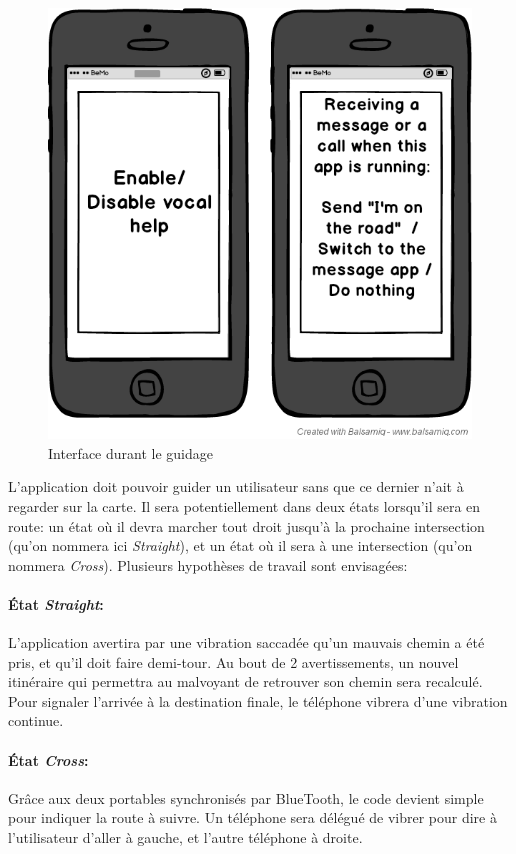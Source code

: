 \documentclass[12pt]{report}
\begin{document}
\begin{figure}[ht]
\begin{center}
\includegraphics[scale=0.3]{Mobile_example.png}
\caption{Interface durant le guidage}
\end{center}
\end{figure}

L'application doit pouvoir guider un utilisateur sans que ce dernier n'ait à regarder sur la carte. Il sera potentiellement dans deux états lorsqu'il sera en route: un état où il devra marcher tout droit jusqu'à la prochaine intersection (qu'on nommera ici \textit{Straight}), et un état où il sera à une intersection (qu'on nommera \textit{Cross}). Plusieurs hypothèses de travail sont envisagées:
\paragraph{État \textit{Straight}: } L'application avertira par une vibration saccadée qu'un mauvais chemin a été pris, et qu'il doit faire demi-tour. Au bout de 2 avertissements, un nouvel itinéraire qui permettra au malvoyant de retrouver son chemin sera recalculé. Pour signaler l'arrivée à la destination finale, le téléphone vibrera d'une vibration continue.
\paragraph{État \textit{Cross}: } Grâce aux deux portables synchronisés par BlueTooth, le code devient simple pour indiquer la route à suivre. Un téléphone sera délégué de vibrer pour dire à l'utilisateur d'aller à gauche, et l'autre téléphone à droite.
\end{document}
